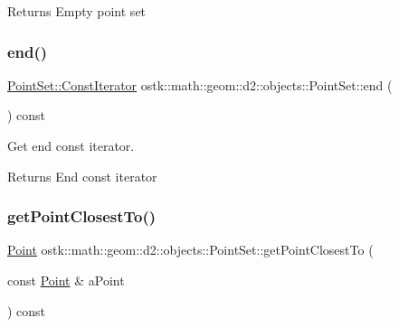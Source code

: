 \begin{DoxyReturn}{Returns}
Empty point set 
\end{DoxyReturn}
\mbox{\label{classostk_1_1math_1_1geom_1_1d2_1_1objects_1_1_point_set_a49b262b5d0e453fd1870cce164b7288d}} 
\subsubsection{\texorpdfstring{end()}{end()}}
{\footnotesize\ttfamily \hyperlink{classostk_1_1math_1_1geom_1_1d2_1_1objects_1_1_point_set_a6a0613cc686e9247430658eee91036d0}{Point\+Set\+::\+Const\+Iterator} ostk\+::math\+::geom\+::d2\+::objects\+::\+Point\+Set\+::end (\begin{DoxyParamCaption}{ }\end{DoxyParamCaption}) const}



Get end const iterator. 

\begin{DoxyReturn}{Returns}
End const iterator 
\end{DoxyReturn}
\mbox{\label{classostk_1_1math_1_1geom_1_1d2_1_1objects_1_1_point_set_a1d08aa1b16ad2865f09a25267c63e58b}} 
\subsubsection{\texorpdfstring{get\+Point\+Closest\+To()}{getPointClosestTo()}}
{\footnotesize\ttfamily \hyperlink{classostk_1_1math_1_1geom_1_1d2_1_1objects_1_1_point}{Point} ostk\+::math\+::geom\+::d2\+::objects\+::\+Point\+Set\+::get\+Point\+Closest\+To (\begin{DoxyParamCaption}\item[{const \hyperlink{classostk_1_1math_1_1geom_1_1d2_1_1objects_1_1_point}{Point} \&}]{a\+Point }\end{DoxyParamCaption}) const}



